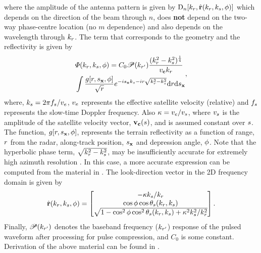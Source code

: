 \documentclass[journal]{IEEEtran}
\begin{document}
where the amplitude of the antenna pattern is given by $\text{D}_{n}[k_r,\hat{\mathbf{r}}(k_r, k_{s}, \phi)]$ which depends on the direction of the beam through $n$, does {\bf not} depend on the two-way phase-centre location (no $m$ dependence) and also depends on the wavelength through $k_r$. The term that corresponds to the geometry and the reflectivity is given by
\begin{equation}
\begin{split}
 &\vkern(\kveczero, \depression) = C_0\Snvelope(\krc)\frac{(\kr^2-\kparm^2)^{\frac{1}{4}}}{v_\sat\kr}\\
 &\int\frac{\reflectivity[\targetrange, \targetxparm, \depression]}{\sqrt{\targetrange}}\eex{-\im \targetxparm\kparm-\im \targetrange\sqrt{\kr^2-\kparm^2}}\d\targetrange\d\targetxparm
 \end{split},
 \label{eq:vparm}
\end{equation} 
where, $k_{s}=2\pi f_{s}/v_e$, $v_e$ represents the effective satellite velocity (relative) and $f_{s}$ represents the slow-time Doppler frequency. Also $\kappa = v_e/\mathnormal{v}_s$, where $\mathnormal{v}_s$ is the amplitude of the satellite velocity vector, $\mathbf{v}_{\mathbf{c}}(s)$, and is assumed constant over $s$.  The function, $g[r, s_{\mathbf{x}}, \phi]$, represents the terrain reflectivity as a function of range, $r$ from the radar, along-track position, $s_{\mathbf{x}}$ and depression angle, $\phi$. Note that the hyperbolic phase term, $\sqrt{k_r^2-k_{s}^2}$, may be insufficiently accurate for extremely high azimuth resolution \cite{Mittermayer}. In this case, a more accurate expression can be computed from the material in \cite{NovelRadar}. The look-direction vector in the 2D frequency domain is given by
\begin{equation}
 \hat{\mathbf{r}}(k_r, k_{s}, \phi) = 
 \begin{bmatrix}
  -\kappa k_{s}/k_r\\
  \cos\phi\cos\theta_s(k_r,k_{s})\\
  \sqrt{1 - \cos^2\phi\cos^2\theta_s(k_r,k_{s}) + \kappa^2k_{s}^2/k_r^2}
 \end{bmatrix}.
\end{equation}
Finally, $\mathscr{P}(k_{r'})$ denotes the baseband frequency ($k_{r'}$) response of the pulsed waveform after processing for pulse compression, and $C_0$ is some constant. Derivation of the above material can be found in \cite{NovelRadar}.
\end{document}
